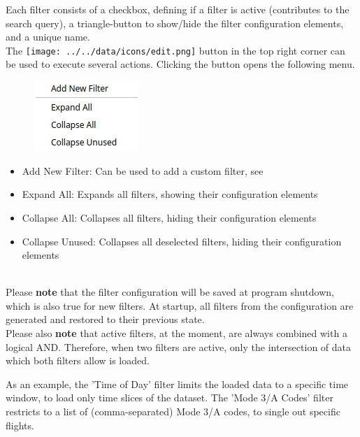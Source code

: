 Each filter consists of a checkbox, defining if a filter is active (contributes to the search query), a triangle-button to show/hide the filter configuration elements, and a unique name. \\

The \texttt{[image: ../../data/icons/edit.png]} button in the top right corner can be used to execute several actions.
Clicking the button opens the following menu.

\begin{figure}[H]
    \center
    \includegraphics[width=4cm,frame]{figures/filter_config.png}
\end{figure}

\begin{itemize}
  \item Add New Filter: Can be used to add a custom filter, see 
  \item Expand All: Expands all filters, showing their configuration elements
  \item Collapse All: Collapses all filters, hiding their configuration elements
  \item Collapse Unused: Collapses all deselected filters, hiding their configuration elements
 \end{itemize} 
 \  \\

Please \textbf{note} that the filter configuration will be saved at program shutdown, which is also true for new filters. At startup, all filters from the configuration are generated and restored to their previous state. \\

Please also \textbf{note} that active filters, at the moment, are always combined with a logical AND. Therefore, when two filters are active, only the intersection of data which both filters allow is loaded.

As an example, the 'Time of Day' filter limits the loaded data to a specific time window, to load only time slices of the dataset. 
The 'Mode 3/A Codes' filter restricts to a list of (comma-separated) Mode 3/A codes, to single out specific flights. \\

